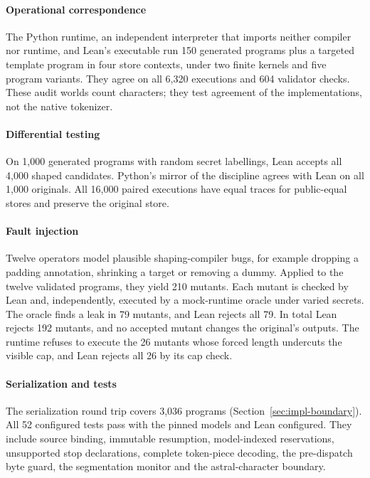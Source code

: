 \paragraph{Operational correspondence}
The Python runtime, an independent interpreter that imports neither compiler nor
runtime, and Lean's executable  run 150 generated programs plus a
targeted template program in four store contexts, under two finite kernels and
five program variants. They agree on all 6,320 executions and 604 validator
checks. These audit worlds count characters; they test agreement of the
implementations, not the native tokenizer.

\paragraph{Differential testing}
On 1,000 generated programs with random secret labellings, Lean accepts all 4,000
shaped candidates. Python's mirror of the discipline agrees with Lean on all 1,000
originals. All 16,000 paired executions have equal traces for public-equal stores
and preserve the original store.

\paragraph{Fault injection}
Twelve operators model plausible shaping-compiler bugs, for example dropping a
padding annotation, shrinking a target or removing a dummy. Applied to the twelve
validated programs, they yield 210 mutants. Each mutant is checked by Lean and,
independently, executed by a mock-runtime oracle under varied secrets. The oracle
finds a leak in 79 mutants, and Lean rejects all 79. In total Lean rejects 192
mutants, and no accepted mutant changes the original's outputs. The runtime refuses
to execute the 26 mutants whose forced length undercuts the visible cap, and Lean
rejects all 26 by its cap check.

\paragraph{Serialization and tests}
The serialization round trip covers 3,036 programs (Section~\ref{sec:impl-boundary}).
All 52 configured tests pass with the pinned models and Lean configured. They
include source binding, immutable resumption, model-indexed reservations,
unsupported stop declarations, complete token-piece decoding, the pre-dispatch
byte guard, the segmentation monitor and the astral-character boundary.

